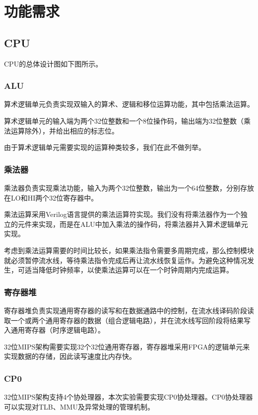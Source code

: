 \section{功能需求}
\subsection{CPU}

CPU的总体设计图如下图所示。



\subsubsection{ALU}
算术逻辑单元负责实现双输入的算术、逻辑和移位运算功能，其中包括乘法运算。

算术逻辑单元的输入端为两个32位整数和一个8位操作码，输出端为32位整数（乘法运算除外），并给出相应的标志位。

由于算术逻辑单元需要实现的运算种类较多，我们在此不做列举。

\subsubsection{乘法器}
乘法器负责实现乘法功能，输入为两个32位整数，输出为一个64位整数，分别存放在LO和HI两个32位寄存器中。

乘法运算采用Verilog语言提供的乘法运算符实现。我们没有将乘法器作为一个独立的元件来实现，而是在ALU中加入乘法的操作码，将乘法器并入算术逻辑单元实现。

考虑到乘法运算需要的时间比较长，如果乘法指令需要多周期完成，那么控制模块就必须暂停流水线，等待乘法指令完成后再让流水线恢复运作。为避免这种情况发生，可适当降低时钟频率，以使乘法运算可以在一个时钟周期内完成运算。

\subsubsection{寄存器堆}
寄存器堆负责实现通用寄存器的读写和在数据通路中的控制，在流水线译码阶段读取一个或两个通用寄存器的数据（组合逻辑电路），并在流水线写回阶段将结果写入通用寄存器（时序逻辑电路）。

32位MIPS架构需要实现32个32位通用寄存器，寄存器堆采用FPGA的逻辑单元来实现数据的存储，因此读写速度比内存快。

\subsubsection{CP0}
32位MIPS架构支持4个协处理器，本次实验需要实现CP0协处理器。CP0协处理器可以实现对TLB、MMU及异常处理的管理机制。

